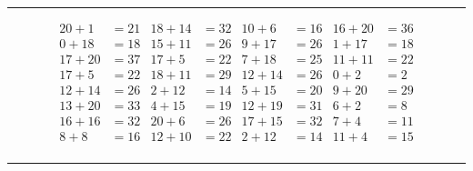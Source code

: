 \documentclass{article}
\begin{document}
\begin{sloppy}
\hrule
\begin{align*}
    {20} + {1} &= {21} & {18} + {14} &= {32} & {10} + {6} &= {16} & {16} + {20} &= {36} \\
    {0} + {18} &= {18} & {15} + {11} &= {26} & {9} + {17} &= {26} & {1} + {17} &= {18} \\
    {17} + {20} &= {37} & {17} + {5} &= {22} & {7} + {18} &= {25} & {11} + {11} &= {22} \\
    {17} + {5} &= {22} & {18} + {11} &= {29} & {12} + {14} &= {26} & {0} + {2} &= {2} \\
    {12} + {14} &= {26} & {2} + {12} &= {14} & {5} + {15} &= {20} & {9} + {20} &= {29} \\
    {13} + {20} &= {33} & {4} + {15} &= {19} & {12} + {19} &= {31} & {6} + {2} &= {8} \\
    {16} + {16} &= {32} & {20} + {6} &= {26} & {17} + {15} &= {32} & {7} + {4} &= {11} \\
    {8} + {8} &= {16} & {12} + {10} &= {22} & {2} + {12} &= {14} & {11} + {4} &= {15} \\
\end{align*}
\hrule
\end{sloppy}
\end{document}
